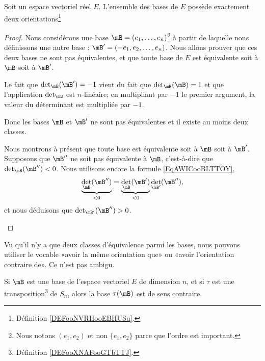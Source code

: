 \begin{lemma}
	Soit un espace vectoriel réel \( E\). L'ensemble des bases de \( E\) possède exactement deux orientations\footnote{Définition \ref{DEFooNVRHooEBHUSu}.}
\end{lemma}

\begin{proof}
	Nous considérons une base \( \mB=(e_1,\ldots, e_n)\)\footnote{Nous notons \( (e_1,e_2)\) et non \( \{ e_1,e_2 \}\) parce que l'ordre est important.} à partir de laquelle nous définissons une autre base : \( \mB'=( -e_1,e_2,\ldots, e_n )\). Nous allons prouver que ces deux bases ne sont pas équivalentes, et que toute base de \( E\) est équivalente soit à \( \mB\) soit à \( \mB'\).

	\begin{subproof}
		Le fait que \( \det_{\mB}(\mB')=-1\) vient du fait que \( \det_{\mB}(\mB)=1\) et que l'application \( \det_{\mB}\) est \( n\)-linéaire; en multipliant par \( -1\) le premier argument, la valeur du déterminant est multipliée par \( -1\).

		Donc les bases \( \mB\) et \( \mB'\) ne sont pas équivalentes et il existe au moins deux classes.

		Nous montrons à présent que toute base est équivalente soit à \( \mB\) soit à \( \mB'\). Supposons que \( \mB''\) ne soit pas équivalente à \( \mB\), c'est-à-dire que \( \det_{\mB}(\mB'')<0\). Nous utilisons encore la formule \eqref{EqAWICooBLTTOY},
		\begin{equation}
			\underbrace{\det_{\mB}(\mB'')}_{<0}=\underbrace{\det_{\mB}(\mB')}_{<0}\det_{\mB'}(\mB''),
		\end{equation}
		et nous déduisons que \( \det_{\mB'}(\mB'')>0\).
	\end{subproof}
\end{proof}

\begin{normaltext}
	Vu qu'il n'y a que deux classes d'équivalence parmi les bases, nous pouvons utiliser le vocable «avoir la même orientation que» ou «avoir l'orientation contraire de». Ce n'est pas ambigu.
\end{normaltext}

\begin{proposition}
	Si \( \mB\) est une base de l'espace vectoriel \( E\) de dimension \( n\), et si \( \tau\) est une transposition\footnote{Définition \ref{DEFooXNAFooGTbTTJ}.} de \( S_n\), alors la base \( \tau(\mB)\) est de sens contraire.
\end{proposition}

